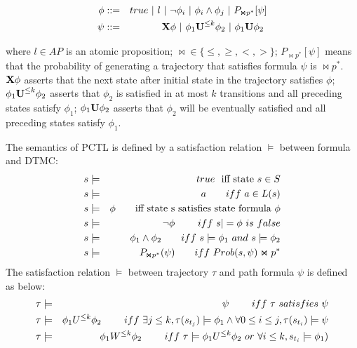 \begin{eqnarray}
\centering
\phi &::=& true\ |\ l\ |\ \neg \phi_i\ |\ \phi_i \land \phi_j\ |\ P_{\Join p^*}[\psi]\label{eq:sec2_statef}\\
\psi &::=& \nextstate\phi\ |\ \phi_1 \until^{\leq k}\phi_2\ |\ \phi_1\until\phi_2\ 
\end{eqnarray}
	
\noindent where $l\in AP$ is an atomic proposition; $\Join\in\{\leq, \geq, <, >\}$; $P_{\Join p^*}[\psi]$ means that the probability of generating a trajectory that satisfies formula $\psi$ is $\Join p^*$. ${\textbf{X}} \phi$ asserts that the next state after initial state in the trajectory satisfies $\phi$; $\phi_1 {\textbf{U}}^{\leq k}\phi_2$ asserts that $\phi_2$ is satisfied in at most $k$ transitions and all preceding states satisfy $\phi_1$; $\phi_1 {\textbf{U}} \phi_2$ asserts that $\phi_2$ will be eventually satisfied and all preceding states satisfy $\phi_1$.

The semantics of PCTL is defined by a satisfaction relation $\models$ between formula and DTMC:
\begin{eqnarray}
\centering
s&\models& true\ \ \text{iff state $s\in S$}\\
s&\models& a\qquad iff\ a\in L(s)\\
s&\models& \phi\qquad \text{iff state s satisfies state formula $\phi$}\\
s&\models& \neg\phi\qquad\ iff\ s|=\phi\ is\ false\\
s&\models& \phi_1\wedge\phi_2\qquad iff\ s\models\phi_1\ and\ s\models\phi_2\\
s&\models& P_{\Join p^*}(\psi)\qquad iff\ Prob(s, \psi)\Join p^*%
\end{eqnarray} 
The satisfaction relation $\models$ between trajectory $\tau$ and path formula $\psi$ is defined as below:
\begin{eqnarray}
\centering
\tau&\models& \psi\qquad\ iff\ \tau\ satisfies\ \psi\\
\tau&\models& \phi_1 U^{\leq k}\phi_2\qquad\ iff\ \exists j\leq k, \tau(s_{t_j})\models \phi_1 \wedge \forall 0\leq i\leq j, \tau(s_{t_i})\models \psi\\
\tau&\models& \phi_1 W^{\leq k}\phi_2\qquad\ iff\ \tau \models \phi_1 U^{\leq k}\phi_2\ or\ \forall i\leq k, s_{t_i}\models \phi_1)
\end{eqnarray} 

